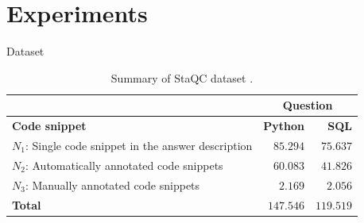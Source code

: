 \documentclass{beamer}
\begin{document}
    \section{Experiments}
    
    \begin{frame}{Dataset}
        \begin{table}[!b]
            {\carlitoTLF %
        \begin{tabularx}{\textwidth}{Xrr}
            & \multicolumn{2}{c}{\textbf{Question}}\\
            \toprule
          \textbf{Code snippet} & \textbf{Python} & \textbf{SQL}  \\
          \toprule
          
            $N_{1}$: Single code snippet in the answer description & $85.294$ & $75.637$ \\
            
            $N_{2}$: Automatically annotated code snippets & $60.083$ & $41.826$ \\
            
            $N_{3}$: Manually annotated code snippets & $2.169$ & $2.056$  \\
          \bottomrule
          \textbf{Total} & $\bm{147.546}$ & $\bm{119.519}$\\
          \bottomrule
        \end{tabularx}}
        \caption{Summary of StaQC dataset \cite{yao-2018}.}
    \label{table:summary-training-data-yao-staqc}
        \end{table}
    \end{frame}
    
\end{document}
